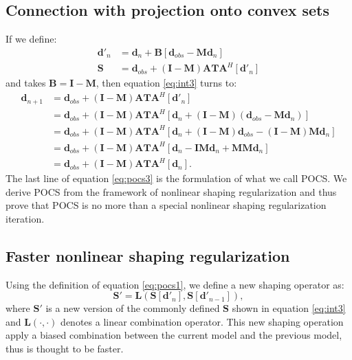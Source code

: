 \subsection{Connection with projection onto convex sets}
If we define: 
\begin{align}
\label{eq:pocs1}
\mathbf{d}'_n &=\mathbf{d}_n+\mathbf{B}[\mathbf{d}_{obs}-\mathbf{Md}_n] \\
\label{eq:pocs2}
\mathbf{S} &= \mathbf{d}_{obs} + (\mathbf{I}-\mathbf{M})\mathbf{ATA}^H[\mathbf{d}'_n]
\end{align}
and takes $\mathbf{B}=\mathbf{I}-\mathbf{M}$, then equation \ref{eq:int3} turns to:
\begin{equation}
\label{eq:pocs3}
\begin{split}
\mathbf{d}_{n+1} &= \mathbf{d}_{obs} + (\mathbf{I}-\mathbf{M})\mathbf{ATA}^H[\mathbf{d}'_n] \\
    		 &= \mathbf{d}_{obs} + (\mathbf{I}-\mathbf{M})\mathbf{ATA}^H[\mathbf{d}_n+(\mathbf{I}-\mathbf{M})(\mathbf{d}_{obs}-\mathbf{Md}_n)] \\
	  	 &= \mathbf{d}_{obs} + (\mathbf{I}-\mathbf{M})\mathbf{ATA}^H[\mathbf{d}_n+(\mathbf{I}-\mathbf{M})\mathbf{d}_{obs}-(\mathbf{I}-\mathbf{M})\mathbf{Md}_n] \\
		 &= \mathbf{d}_{obs} + (\mathbf{I}-\mathbf{M})\mathbf{ATA}^H[\mathbf{d}_n-\mathbf{I}\mathbf{Md}_n+\mathbf{M}\mathbf{Md}_n] \\
		 &= \mathbf{d}_{obs} + (\mathbf{I}-\mathbf{M})\mathbf{ATA}^H[\mathbf{d}_n].
\end{split}
\end{equation}
The last line of equation \ref{eq:pocs3} is the formulation of what we call POCS. We derive POCS from the framework of nonlinear shaping regularization and thus prove that POCS is no more than a special nonlinear shaping regularization iteration.


\subsection{Faster nonlinear shaping regularization}
Using the definition of equation \ref{eq:pocs1}, we define a new shaping operator as:
\begin{equation}
\label{eq:fshape1}
\mathbf{S}'=\mathbf{L}(\mathbf{S}[\mathbf{d}'_n],\mathbf{S}[\mathbf{d}'_{n-1}]),
\end{equation}
where $\mathbf{S}'$ is a new version of the commonly defined $\mathbf{S}$ shown in equation \ref{eq:int3} and $\mathbf{L}(\cdot,\cdot)$ denotes a linear combination operator. This new shaping operation apply a biased combination between the current model and the previous model, thus is thought to be faster.

